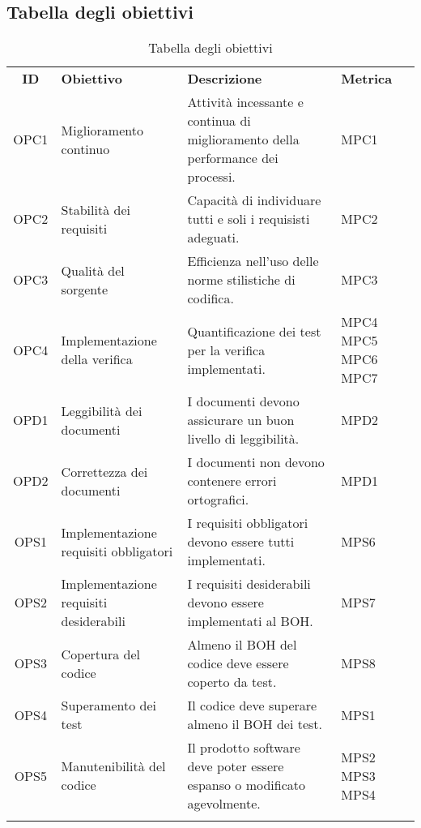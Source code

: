 \subsection{Tabella degli obiettivi}

\begin{longtable}{| c | p{5cm} | p{5cm} | p{2cm} |}
	\rowcolor{LightBlue}
	\color{white}\bfseries ID & \color{white}\bfseries Obiettivo & \color{white}\bfseries Descrizione & \color{white}\bfseries Metrica \\[0.25cm]
	OPC1 & Miglioramento continuo & Attività incessante e continua di miglioramento della performance dei processi. & MPC1 \\ \hline
	OPC2 & Stabilità dei requisiti & Capacità di individuare tutti e soli i requisisti adeguati. & MPC2 \\ \hline
	OPC3 & Qualità del sorgente & Efficienza nell'uso delle norme stilistiche di codifica. & MPC3 \\ \hline
	OPC4 & Implementazione della verifica & Quantificazione dei test per la verifica implementati. & MPC4 MPC5 MPC6 MPC7 \\ \hline
	OPD1 & Leggibilità dei documenti & I documenti devono assicurare un buon livello di leggibilità. & MPD2 \\ \hline
	OPD2 & Correttezza dei documenti & I documenti non devono contenere errori ortografici. & MPD1 \\ \hline
	OPS1 & Implementazione requisiti obbligatori & I requisiti obbligatori devono essere tutti implementati. & MPS6 \\ \hline
	OPS2 & Implementazione requisiti desiderabili & I requisiti desiderabili devono essere implementati al BOH. & MPS7 \\ \hline
	OPS3 & Copertura del codice & Almeno il BOH del codice deve essere coperto da test. & MPS8 \\ \hline
	OPS4 & Superamento dei test & Il codice deve superare almeno il BOH dei test. & MPS1 \\ \hline
	OPS5 & Manutenibilità del codice & Il prodotto software deve poter essere espanso o modificato agevolmente. & MPS2 MPS3 MPS4 \\ \hline 
	\caption{Tabella degli obiettivi} 
\end{longtable}